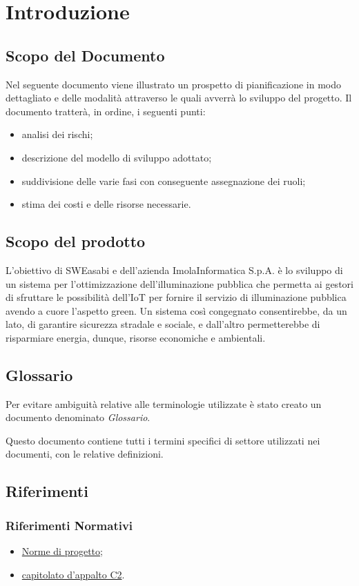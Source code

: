 \chapter{Introduzione}

\section{Scopo del Documento}
Nel seguente documento viene illustrato un prospetto di pianificazione in modo dettagliato e delle modalità attraverso le quali avverrà lo sviluppo del progetto. Il documento tratterà, in ordine, i seguenti punti:
\begin{itemize}
    \item analisi dei rischi;
    \item descrizione del modello di sviluppo adottato;
    \item suddivisione delle varie fasi con conseguente assegnazione dei ruoli;
    \item stima dei costi e delle risorse necessarie.
\end{itemize}

\section{Scopo del prodotto}
L'obiettivo di SWEasabi e dell'azienda ImolaInformatica S.p.A. è lo sviluppo di un sistema per l'ottimizzazione dell'illuminazione pubblica che permetta ai gestori di sfruttare le possibilità dell'IoT per fornire il servizio di illuminazione pubblica avendo a cuore l'aspetto green. Un sistema così congegnato consentirebbe, da un lato, di garantire sicurezza stradale e sociale, e dall'altro permetterebbe di risparmiare energia, dunque, risorse economiche e ambientali.


\section{Glossario}
Per evitare ambiguità relative alle terminologie utilizzate è stato creato un documento denominato \textit{Glossario}.

Questo documento contiene tutti i termini specifici di settore utilizzati nei documenti, con le relative definizioni.

\section{Riferimenti}
\subsection{Riferimenti Normativi}
\begin{itemize}
    \item \href{https://github.com/SWEasabi/norme-di-progetto/releases}{Norme di progetto};
    \item \href{https://www.math.unipd.it/~tullio/IS-1/2022/Progetto/C2.pdf}{capitolato d'appalto C2}.
\end{itemize}

